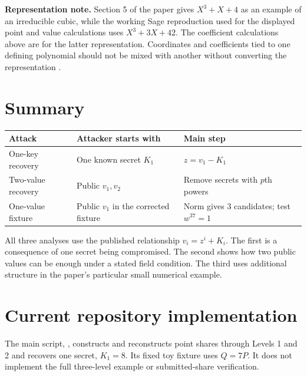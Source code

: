 \documentclass[11pt]{article}
\begin{document}
\textbf{Representation note.} Section 5 of the paper gives $X^3+X+4$ as an example of an irreducible cubic, while the working Sage reproduction used for the displayed point and value calculations uses $X^3+3X+42$. The coefficient calculations above are for the latter representation. Coordinates and coefficients tied to one defining polynomial should not be mixed with another without converting the representation \cite[Sec.~5, pp.~1462--1463]{chintamani2024}.

\section{Summary}

\begin{center}
\begin{tabular}{@{}lll@{}}
\toprule
Attack & Attacker starts with & Main step \\
\midrule
One-key recovery & One known secret $K_1$ & $z=v_1-K_1$ \\
Two-value recovery & Public $v_1,v_2$ & Remove secrets with $p$th powers \\
One-value fixture & Public $v_1$ in the corrected fixture & Norm gives 3 candidates; test $w^{37}=1$ \\
\bottomrule
\end{tabular}
\end{center}

All three analyses use the published relationship $v_i=z^i+K_i$. The first is a consequence of one secret being compromised. The second shows how two public values can be enough under a stated field condition. The third uses additional structure in the paper's particular small numerical example.

\clearpage
\section{Current repository implementation}

The main script, , constructs and reconstructs
point shares through Levels 1 and 2 and recovers one secret, $K_1=8$.
Its fixed toy fixture uses $Q=7P$. It does not implement the full
three-level example or submitted-share verification.
\end{document}
